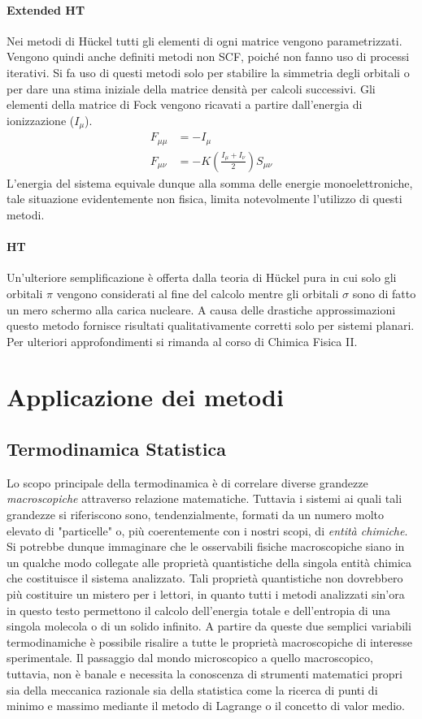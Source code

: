 \documentclass[oneside]{amsbook}
\numberwithin{section}{chapter}
\numberwithin{equation}{section}
\numberwithin{figure}{section}
\begin{document}
\subsection{Extended HT}
Nei metodi di H\"uckel tutti gli elementi di ogni matrice vengono parametrizzati. Vengono quindi anche definiti metodi non SCF, poiché non fanno uso di processi iterativi.
Si fa uso di questi metodi solo per stabilire la simmetria degli orbitali o per dare una stima iniziale della matrice densità per calcoli successivi.
Gli elementi della matrice di Fock vengono ricavati a partire dall'energia di ionizzazione ($I_\mu$).
\begin{equation}
\begin{aligned}
F_{\mu\mu}&=-I_\mu \\
F_{\mu\nu}&= -K \left(\frac{I_\mu+I_\nu}{2}\right) S_{\mu\nu}
\end{aligned}
\end{equation}
L'energia del sistema equivale dunque alla somma delle energie monoelettroniche, tale situazione evidentemente non fisica, limita notevolmente l'utilizzo di questi metodi.
\subsection{HT}
Un'ulteriore semplificazione è offerta dalla teoria di H\"uckel pura in cui solo gli orbitali $\pi$ vengono considerati al fine del calcolo mentre gli orbitali $\sigma$ sono di fatto un mero schermo alla carica nucleare.
A causa delle drastiche approssimazioni questo metodo fornisce risultati qualitativamente corretti solo per sistemi planari. Per ulteriori approfondimenti si rimanda al corso di Chimica Fisica II.
\part{Applicazione dei metodi}\label{p3}
\chapter{Termodinamica Statistica}
Lo scopo principale della termodinamica è di correlare diverse grandezze \emph{macroscopiche} attraverso relazione matematiche. Tuttavia i sistemi ai quali tali grandezze si riferiscono sono, tendenzialmente, formati da un numero molto elevato di "particelle" o, più coerentemente con i nostri scopi, di \emph{entità chimiche}. Si potrebbe dunque immaginare che le osservabili fisiche macroscopiche siano in un qualche modo collegate alle proprietà quantistiche della singola entità chimica che costituisce il sistema analizzato. Tali proprietà quantistiche non dovrebbero più costituire un mistero per i lettori, in quanto tutti i metodi analizzati sin'ora in questo testo permettono il calcolo dell'energia totale e dell'entropia di una singola molecola o di un solido infinito. A partire da queste due semplici variabili termodinamiche è possibile risalire a tutte le proprietà macroscopiche di interesse sperimentale.
Il passaggio dal mondo microscopico a quello macroscopico, tuttavia, non è banale e necessita la conoscenza di strumenti matematici propri sia della meccanica razionale sia della statistica come la ricerca di punti di minimo e massimo mediante il metodo di Lagrange  o il concetto di valor medio.
\end{document}
